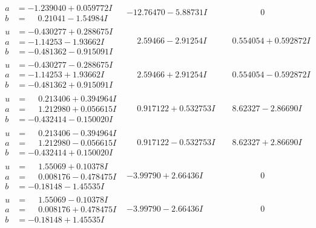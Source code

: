 \documentclass[1p]{elsarticle_modified}
\theoremstyle{definition}
\begin{document}
$$\begin{array}{c|c|c}
\begin{aligned}
a &= -1.239040 + 0.059772 I \\
b &= \phantom{-}0.21041 - 1.54984 I\end{aligned}
 & -12.76470 - 5.88731 I & \phantom{-0.000000 } 0 \\ \hline\begin{aligned}
u &= -0.430277 + 0.288675 I \\
a &= -1.14253 - 1.93662 I \\
b &= -0.481362 - 0.915091 I\end{aligned}
 & \phantom{-}2.59466 - 2.91254 I & \phantom{-}0.554054 + 0.592872 I \\ \hline\begin{aligned}
u &= -0.430277 - 0.288675 I \\
a &= -1.14253 + 1.93662 I \\
b &= -0.481362 + 0.915091 I\end{aligned}
 & \phantom{-}2.59466 + 2.91254 I & \phantom{-}0.554054 - 0.592872 I \\ \hline\begin{aligned}
u &= \phantom{-}0.213406 + 0.394964 I \\
a &= \phantom{-}1.212980 + 0.056615 I \\
b &= -0.432414 - 0.150020 I\end{aligned}
 & \phantom{-}0.917122 + 0.532753 I & \phantom{-}8.62327 - 2.86690 I \\ \hline\begin{aligned}
u &= \phantom{-}0.213406 - 0.394964 I \\
a &= \phantom{-}1.212980 - 0.056615 I \\
b &= -0.432414 + 0.150020 I\end{aligned}
 & \phantom{-}0.917122 - 0.532753 I & \phantom{-}8.62327 + 2.86690 I \\ \hline\begin{aligned}
u &= \phantom{-}1.55069 + 0.10378 I \\
a &= \phantom{-}0.008176 - 0.478475 I \\
b &= -0.18148 - 1.45535 I\end{aligned}
 & -3.99790 + 2.66436 I & \phantom{-0.000000 } 0 \\ \hline\begin{aligned}
u &= \phantom{-}1.55069 - 0.10378 I \\
a &= \phantom{-}0.008176 + 0.478475 I \\
b &= -0.18148 + 1.45535 I\end{aligned}
 & -3.99790 - 2.66436 I & \phantom{-0.000000 } 0 \\ \hline\begin{aligned}

\end{aligned}
\end{array}$$
\end{document}
